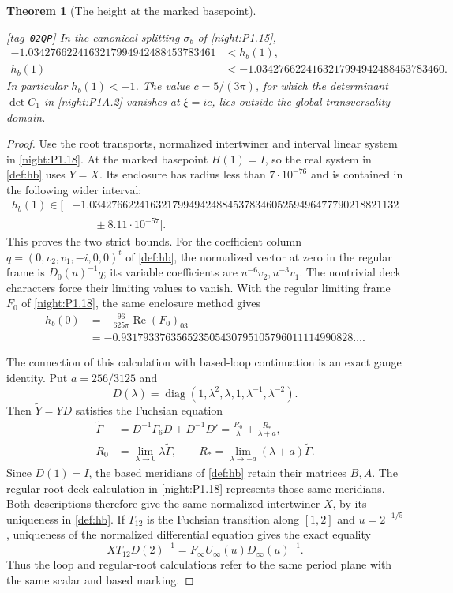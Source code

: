 \documentclass[11pt,a4paper]{article}
\numberwithin{equation}{section}
\newtheorem{theorem}{Theorem}[section]
\theoremstyle{definition}
\newcommand{\StatementRecord}[4]{{\upshape\footnotesize[tag~\texttt{#3}]}\enspace\ignorespaces}
\begin{document}
\begin{theorem}[The height at the marked basepoint]
\hypertarget{tag-02QP}{}\label{night:P1.16}
\StatementRecord{night:P1.16}{proved}{02QP}{\cref{night:P1.15}, \cref{night:P1.18}, \cref{night:P1.8}}
In the canonical splitting $\sigma_b$ of \cref{night:P1.15},
\[
\begin{aligned}
-1.0342766224163217994942488453783461&<h_b(1),\\
h_b(1)&<-1.0342766224163217994942488453783460.
\end{aligned}
\]
In particular $h_b(1)<-1$. The value $c=5/(3\pi)$, for which
the determinant $\det C_1$ in \cref{night:P1A.2} vanishes at
$\xi=ic$, lies outside the global transversality domain.
\end{theorem}
\begin{proof}
Use the root transports, normalized intertwiner and interval
linear system in \cref{night:P1.18}. At the marked basepoint
$H(1)=I$, so the real system in \cref{def:hb} uses $Y=X$.
Its enclosure has radius less than $7\cdot10^{-76}$ and is
contained in the following wider interval:
\[
\begin{aligned}
h_b(1)\in\bigl[&
-1.03427662241632179949424884537834605259496477790218821132\\
&\qquad\mathbin{\pm}8.11\cdot10^{-57}\bigr].
\end{aligned}
\]
This proves the two strict bounds. For the coefficient column
$q=(0,v_2,v_1,-i,0,0)^t$ of \cref{def:hb}, the normalized
vector at zero in the regular frame is $D_0(u)^{-1}q$; its variable coefficients
are $u^{-6}v_2,u^{-3}v_1$. The nontrivial deck characters
force their limiting values to vanish. With the regular limiting frame $F_0$
of \cref{night:P1.18}, the same enclosure method gives
\[
\begin{aligned}
h_b(0)&=-\frac{96}{625\pi}\operatorname{Re}(F_0)_{03}\\
&=-0.931793376356523505430795105796011114990828\ldots .
\end{aligned}
\]

The connection of this calculation with based-loop continuation
is an exact gauge identity. Put $a=256/3125$ and
\[
D(\lambda)=\operatorname{diag}
 (1,\lambda^2,\lambda,1,\lambda^{-1},\lambda^{-2}).
\]
Then $\widetilde Y=YD$ satisfies the Fuchsian equation
\[
\begin{aligned}
\widetilde\Gamma
 &=D^{-1}\Gamma_6D+D^{-1}D'
 =\frac{R_0}{\lambda}+\frac{R_*}{\lambda+a},\\
R_0&=\lim_{\lambda\to0}\lambda\widetilde\Gamma,
\qquad
R_* =\lim_{\lambda\to-a}(\lambda+a)\widetilde\Gamma.
\end{aligned}
\]
Since $D(1)=I$, the based meridians of \cref{def:hb}
retain their matrices $B,A$. The regular-root deck calculation
in \cref{night:P1.18} represents those same meridians.
Both descriptions therefore give the same normalized
intertwiner $X$, by its uniqueness in \cref{def:hb}.
If $T_{12}$ is the Fuchsian transition along $[1,2]$ and
$u=2^{-1/5}$, uniqueness of the normalized differential equation
gives the exact equality
\[
XT_{12}D(2)^{-1}
 =F_\infty U_\infty(u)D_\infty(u)^{-1}.
\]
Thus the loop and regular-root calculations refer to the same
period plane with the same scalar and based marking.


\end{proof}
\end{document}
